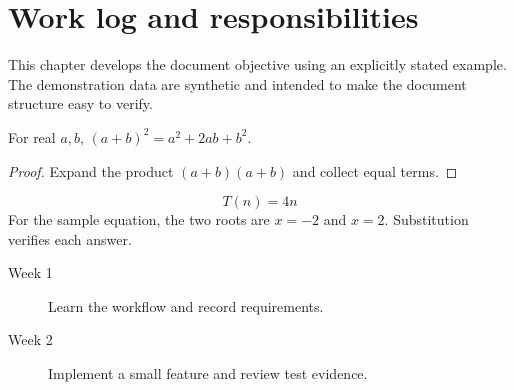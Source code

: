 \chapter{Work log and responsibilities}


\label{sec:chapter2}
This chapter develops the document objective using an explicitly stated example. The demonstration data are synthetic and intended to make the document structure easy to verify.

\begin{demotheorem}
For real $a,b$, $(a+b)^2=a^2+2ab+b^2$.
\end{demotheorem}
\begin{proof}
Expand the product $(a+b)(a+b)$ and collect equal terms.
\end{proof}
\[T(n)=4n\]
For the sample equation, the two roots are $x=-2$ and $x=2$. Substitution verifies each answer.
\begin{description}
\item[Week 1] Learn the workflow and record requirements.
\item[Week 2] Implement a small feature and review test evidence.
\end{description}
